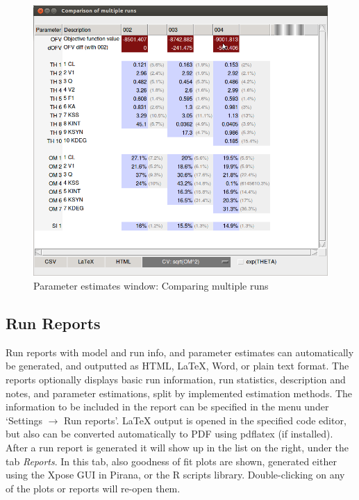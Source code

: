{{{\begin{figure}[H] \centering
    \includegraphics[scale=0.3]{images/compare_estimates.png}
    \caption{Parameter estimates window: Comparing multiple runs}
\end{figure}


\subsection{Run Reports} Run reports with model and run info, and parameter estimates can automatically be generated, and outputted as HTML, \LaTeX \hspace{2pt},
Word, or plain text format. The reports optionally displays basic run
information, run statistics, description and notes, and parameter
estimations, split by implemented estimation methods. The information to
be included in the report can be specified in the menu under `Settings
$\rightarrow$ Run reports'. \LaTeX \hspace{2pt} output is opened in
the specified code editor, but also can be converted automatically to
PDF using pdflatex (if installed).\\

\noindent After a run report is generated it will show up in the list
on the right, under the tab \textit{Reports}. In this tab, also
goodness of fit plots are shown, generated either using the Xpose GUI
in Pirana, or the R scripts library. Double-clicking on any of the
plots or reports will re-open them.\\

}}}
